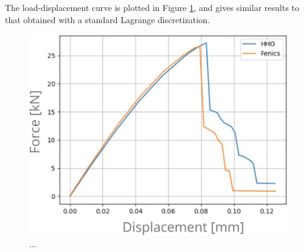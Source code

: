 The load-displacement curve is plotted
in Figure \ref{fig_matrix_curve}, and gives similar results to that obtained with a standard Lagrange discretization.
%
% 
% 
\begin{figure}[H]
    \centering
    \includegraphics[width=7.cm]{../chapter_03_hho_micromorphic/figures/plate_curve.png}
    \caption{...}
    \label{fig_matrix_curve}
\end{figure}